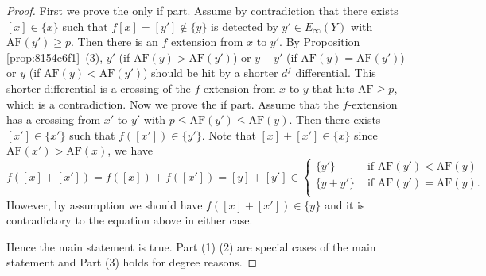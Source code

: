 \documentclass{amsart}
\numberwithin{equation}{section}
\newcommand{\AF}{\mathrm{AF}}
\begin{document}
\begin{proof}
    First we prove the only if part. Assume by contradiction that there exists $[x]\in \{x\}$ such that $f[x]=[y']\notin \{y\}$ is detected by $y'\in E_\infty(Y)$ with $\AF(y')\ge p$. Then there is an $f$ extension from $x$ to $y'$. By Proposition \ref{prop:8154e6f1}~(3), $y'$ (if $\AF(y)>\AF(y')$)  or $y-y'$ (if $\AF(y)=\AF(y')$) or $y$ (if $\AF(y)<\AF(y')$) should be hit by a shorter $d^f$ differential. This shorter differential is a crossing of the $f$-extension from $x$ to $y$ that hits $\AF\ge p$, which is a contradiction. Now we prove the if part. Assume that the $f$-extension has a crossing from $x'$ to $y'$ with $p\le \AF(y')\le \AF(y)$. Then there exists $[x']\in \{x'\}$ such that $f([x'])\in \{y'\}$. Note that $[x]+[x']\in \{x\}$ since $\AF(x')>\AF(x)$, we have
    $$f([x]+[x'])=f([x])+f([x'])=[y]+[y']\in\begin{cases}
        \{y'\} & \text{ if } \AF(y')<\AF(y)\\
        \{y+y'\} & \text{ if } \AF(y')=\AF(y).\\
    \end{cases}$$
    However, by assumption we should have $f([x]+[x'])\in \{y\}$ and it is contradictory to the equation above in either case.
    
    Hence the main statement is true.  Part (1) (2) are special cases of the main statement and Part (3) holds for degree reasons.
\end{proof}
\end{document}

